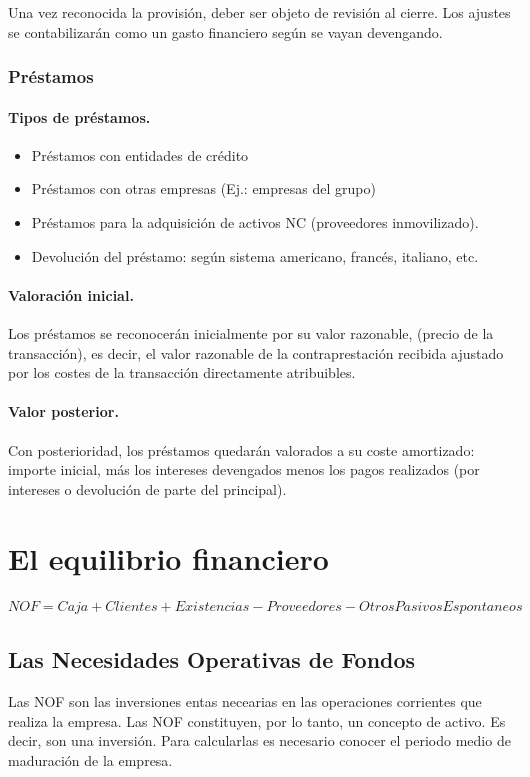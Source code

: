 Una vez reconocida la provisión, deber ser objeto de revisión al cierre. Los ajustes se contabilizarán como un gasto financiero según se vayan devengando.

\subsubsection{Préstamos}
\paragraph{Tipos de préstamos.}
\begin{itemize}
    \item Préstamos con entidades de crédito
    \item Préstamos con otras empresas (Ej.: empresas del grupo)
    \item Préstamos para la adquisición de activos NC (proveedores inmovilizado).
    \item Devolución del préstamo: según sistema americano, francés, italiano, etc.
\end{itemize}

\paragraph{Valoración inicial.}
Los préstamos se reconocerán inicialmente por su valor razonable, (precio de la transacción), es decir, el valor razonable de la contraprestación recibida ajustado por los costes de la transacción directamente atribuibles.

\paragraph{Valor posterior.}
Con posterioridad, los préstamos quedarán valorados a su coste amortizado: importe inicial, más los intereses devengados menos los pagos realizados (por intereses o devolución de parte del principal).

\section{El equilibrio financiero}
$NOF = Caja + Clientes + Existencias - Proveedores - Otros Pasivos Espontaneos$
\subsection{Las Necesidades Operativas de Fondos}
Las NOF son las inversiones entas necearias en las operaciones corrientes que realiza la empresa. Las NOF constituyen, por lo tanto, un concepto de activo. Es decir, son una inversión. Para calcularlas es necesario conocer el periodo medio de maduración de la empresa.

